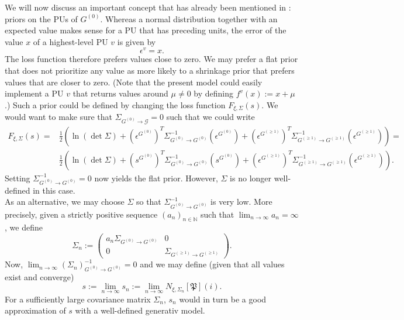 \documentclass[a4paper,11pt]{report}
\begin{document}
\begin{Par}\label{predicode-5}
We will now discuss an important concept that has already been mentioned in : priors on the PUs of $G^{(0)}$. Whereas a normal distribution together with an expected value makes sense for a PU that has preceding units, the error of the value $x$ of a highest-level PU $v$ is given by
\[
\epsilon^v=x.
\]
The loss function therefore prefers values close to zero. We may prefer a flat prior that does not prioritize any value as more likely to a shrinkage prior that prefers values that are closer to zero. (Note that the present model could easily implement a PU $v$ that returns values around $\mu\ne 0$ by defining $f^v(x):=x+\mu$.) Such a prior could be defined by changing the loss function $F_{\xi,\Sigma}(s)$. We would want to make sure that $\Sigma_{G^{(0)}\to\mathcal{G}}=0$ such that we could write
\begin{align*}
F_{\xi,\Sigma}(s)=&\frac{1}{2}\left(\ln(\det\Sigma)+\left(\epsilon^{G^{(0)}}\right)^T\Sigma^{-1}_{G^{(0)}\to G^{(0)}}\left(\epsilon^{G^{(0)}}\right)+\left(\epsilon^{G^{(\ge 1)}}\right)^T\Sigma^{-1}_{G^{(\ge 1)}\to G^{(\ge1)}}\left(\epsilon^{G^{(\ge1)}}\right)\right)=\\
&\frac{1}{2}\left(\ln(\det\Sigma)+\left(s^{G^{(0)}}\right)^T\Sigma^{-1}_{G^{(0)}\to G^{(0)}}\left(s^{G^{(0)}}\right)+\left(\epsilon^{G^{(\ge 1)}}\right)^T\Sigma^{-1}_{G^{(\ge 1)}\to G^{(\ge1)}}\left(\epsilon^{G^{(\ge1)}}\right)\right).
\end{align*}
Setting $\Sigma^{-1}_{G^{(0)}\to G^{(0)}}=0$ now yields the flat prior. However, $\Sigma$ is no longer well-defined in this case.\\
As an alternative, we may choose $\Sigma$ so that $\Sigma^{-1}_{G^{(0)}\to G^{(0)}}$ is very low. More precisely, given a strictly positive sequence $(a_n)_{n\in\mathbb{N}}$ such that $\lim_{n\to\infty}a_n=\infty$, we define 
\[
\Sigma_n:=\begin{pmatrix}
a_n\Sigma_{G^{(0)}\to G^{(0)}}&0\\
0&\Sigma_{G^{(\ge1)}\to G^{(\ge1)}}
\end{pmatrix}.
\]
Now, $\lim_{n\to\infty}\left(\Sigma_n\right)_{G^{(0)}\to G^{(0)}}^{-1}=0$ and we may define (given that all values exist and converge)
\[
s:=\lim_{n\to\infty}s_n:=\lim_{n\to\infty}N_{\xi,\Sigma_n}[\mathfrak{P}](i).
\]
For a sufficiently large covariance matrix $\Sigma_n$, $s_n$ would in turn be a good approximation of $s$ with a well-defined generativ model.\\

\end{Par}
\end{document}
